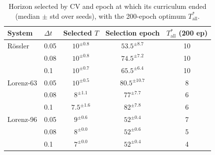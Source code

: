 \begin{table}[htbp]
  \centering
  \caption{Horizon selected by CV and epoch at which its curriculum ended (median $\pm$ std over seeds), with the 200-epoch optimum $T^*_{\mathrm{all}}$.}
  \label{tab:cv-horizons}
  \small
  \begin{tabular}{ll ccc}
    \toprule
    System & $\Delta t$ & Selected $T$ & Selection epoch & $T^*_{\mathrm{all}}$ (200 ep) \\
    \midrule
    Rössler & 0.05 & $10^{\pm 0.8}$ & $53.5^{\pm 8.7}$ & 10 \\
     & 0.08 & $10^{\pm 0.8}$ & $74.5^{\pm 7.2}$ & 10 \\
     & 0.1 & $10^{\pm 0.7}$ & $65.5^{\pm 6.4}$ & 10 \\
    \midrule
    Lorenz-63 & 0.05 & $10^{\pm 0.5}$ & $80.5^{\pm 10.7}$ & 8 \\
     & 0.08 & $8^{\pm 1.1}$ & $77^{\pm 7.7}$ & 6 \\
     & 0.1 & $7.5^{\pm 1.6}$ & $82^{\pm 7.8}$ & 6 \\
    \midrule
    Lorenz-96 & 0.05 & $9^{\pm 0.6}$ & $52^{\pm 0.4}$ & 7 \\
     & 0.08 & $8^{\pm 0.0}$ & $52^{\pm 0.6}$ & 5 \\
     & 0.1 & $7^{\pm 0.0}$ & $52^{\pm 0.4}$ & 4 \\
    \bottomrule
  \end{tabular}
\end{table}
